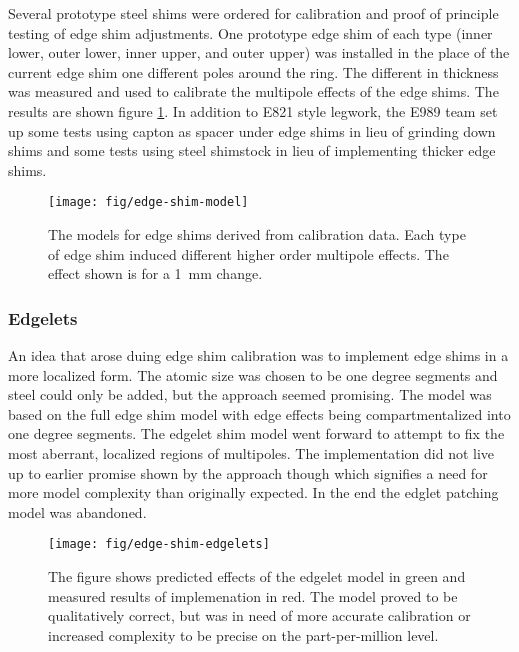 Several prototype steel shims were ordered for calibration and proof of principle testing of edge shim adjustments.  One prototype edge shim of each type (inner lower, outer lower, inner upper, and outer upper) was installed in the place of the current edge shim one different poles around the ring.  The different in thickness was measured and used to calibrate the multipole effects of the edge shims.  The results are shown figure \ref{fig:edge-shim-model}. In addition to E821 style legwork, the E989 team set up some tests using capton as spacer under edge shims in lieu of grinding down shims and some tests using steel shimstock in lieu of implementing thicker edge shims.

\begin{figure}
\texttt{[image: fig/edge-shim-model]}
\caption{The models for edge shims derived from calibration data.  Each type of edge shim induced different higher order multipole effects.  The effect shown is for a \SI{1}{\milli\meter} change. }
\label{fig:edge-shim-model}
\end{figure}


\subsubsection{Edgelets}

An idea that arose duing edge shim calibration was to implement edge shims in a more localized form.  The atomic size was chosen to be one degree segments and steel could only be added, but the approach seemed promising.  The model was based on the full edge shim model with edge effects being compartmentalized into one degree segments.  The edgelet shim model went forward to attempt to fix the most aberrant, localized regions of multipoles.  The implementation did not live up to earlier promise shown by the approach though which signifies a need for more model complexity than originally expected. In the end the edglet patching model was abandoned.

\begin{figure}
\texttt{[image: fig/edge-shim-edgelets]}
\caption{The figure shows predicted effects of the edgelet model in green and measured results of implemenation in red.  The model proved to be qualitatively correct, but was in need of more accurate calibration or increased complexity to be precise on the part-per-million level.}
\label{fig:edge-shim-edgelets}
\end{figure}

